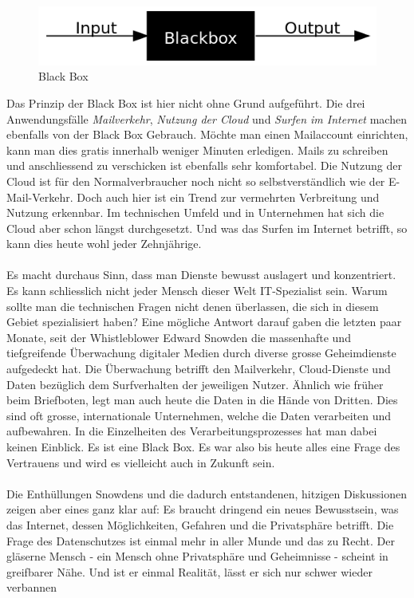 \begin{figure}[h]
\centering
\includegraphics[scale=0.75]{images/BlackBox}
\caption{Black Box}
\end{figure}

Das Prinzip der Black Box ist hier nicht ohne Grund aufgeführt. Die drei Anwendungsfälle \textit{Mailverkehr}, \textit{Nutzung der Cloud} und \textit{Surfen im Internet} machen ebenfalls von der Black Box Gebrauch. Möchte man einen Mailaccount einrichten, kann man dies gratis innerhalb weniger Minuten erledigen. Mails zu schreiben und anschliessend zu verschicken ist ebenfalls sehr komfortabel. Die Nutzung der Cloud ist für den Normalverbraucher noch nicht so selbstverständlich wie der E-Mail-Verkehr. Doch auch hier ist ein Trend zur vermehrten Verbreitung und Nutzung erkennbar. Im technischen Umfeld und in Unternehmen hat sich die Cloud aber schon längst durchgesetzt. Und was das Surfen im Internet betrifft, so kann dies heute wohl jeder Zehnjährige.
\\
\\
Es macht durchaus Sinn, dass man Dienste bewusst auslagert und konzentriert. Es kann schliesslich nicht jeder Mensch dieser Welt IT-Spezialist sein. Warum sollte man die technischen Fragen nicht denen überlassen, die sich in diesem Gebiet spezialisiert haben? Eine mögliche Antwort darauf gaben die letzten paar Monate, seit der Whistleblower Edward Snowden die massenhafte und tiefgreifende Überwachung digitaler Medien durch diverse grosse Geheimdienste aufgedeckt hat. Die Überwachung betrifft den Mailverkehr, Cloud-Dienste und Daten bezüglich dem Surfverhalten der jeweiligen Nutzer. Ähnlich wie früher beim Briefboten, legt man auch heute die Daten in die Hände von Dritten. Dies sind oft grosse, internationale Unternehmen, welche die Daten verarbeiten und aufbewahren. In die Einzelheiten des Verarbeitungsprozesses hat man dabei keinen Einblick. Es ist eine Black Box. Es war also bis heute alles eine Frage des Vertrauens und wird es vielleicht auch in Zukunft sein.
\\
\\
Die Enthüllungen Snowdens und die dadurch entstandenen, hitzigen Diskussionen zeigen aber eines ganz klar auf: Es braucht dringend ein neues Bewusstsein, was das Internet, dessen Möglichkeiten,  Gefahren und die Privatsphäre betrifft. Die Frage des Datenschutzes ist einmal mehr in aller Munde und das zu Recht. Der gläserne Mensch - ein Mensch ohne Privatsphäre und Geheimnisse - scheint in greifbarer Nähe. Und ist er einmal Realität, lässt er sich nur schwer wieder verbannen
